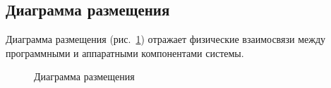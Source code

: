 
%
%
%
%
%

\subsection{Диаграмма размещения}

Диаграмма размещения (рис.~\ref{place:image}) отражает физические взаимосвязи между программными и аппаратными компонентами системы.

\begin{figure}[ht]
\caption{Диаграмма размещения}
\label{place:image}
\end{figure}


